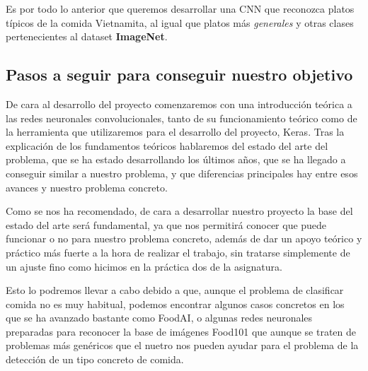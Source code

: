 \vspace{3 mm}

Es por todo lo anterior que queremos desarrollar una CNN que reconozca platos típicos de la comida Vietnamita, al igual que platos más \textit{generales} y otras clases pertenecientes al dataset \textbf{ImageNet}.


\subsection{Pasos a seguir para conseguir nuestro objetivo}

De cara al desarrollo del proyecto comenzaremos con una introducción teórica a las redes neuronales convolucionales, tanto de su funcionamiento teórico como de la herramienta que utilizaremos para el desarrollo del proyecto, Keras. Tras la explicación de los fundamentos teóricos hablaremos del estado del arte del problema, que se ha estado desarrollando los últimos años, que se ha llegado a conseguir similar a nuestro problema, y que diferencias principales hay entre esos avances y nuestro problema concreto.

Como se nos ha recomendado, de cara a desarrollar nuestro proyecto la base del estado del arte será fundamental, ya que nos permitirá conocer que puede funcionar o no para nuestro problema concreto, además de dar un apoyo teórico y práctico más fuerte a la hora de realizar el trabajo, sin tratarse simplemente de un ajuste fino como hicimos en la práctica dos de la asignatura.

Esto lo podremos llevar a cabo debido a que, aunque el problema de clasificar comida no es muy habitual, podemos encontrar algunos casos concretos en los que se ha avanzado bastante como FoodAI, o algunas redes neuronales preparadas para reconocer la base de imágenes Food101 que aunque se traten de problemas más genéricos que el nuetro nos pueden ayudar para el problema de la detección de un tipo concreto de comida.
